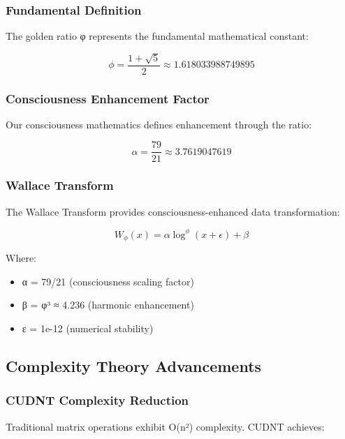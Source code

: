 \documentclass[11pt,a4paper]{article}
\begin{document}
\subsubsection{Fundamental Definition}

The golden ratio φ represents the fundamental mathematical constant:

\begin{equation}
\phi = \frac{1 + \sqrt{5}}{2} \approx 1.618033988749895
\end{equation}

\subsubsection{Consciousness Enhancement Factor}

Our consciousness mathematics defines enhancement through the ratio:

\begin{equation}
\alpha = \frac{79}{21} \approx 3.7619047619
\end{equation}

\subsubsection{Wallace Transform}

The Wallace Transform provides consciousness-enhanced data transformation:

\begin{equation}
W_\phi(x) = \alpha \log^\phi(x + \epsilon) + \beta
\end{equation}

Where:
\begin{itemize}
\item α = 79/21 (consciousness scaling factor)
\item β = φ³ ≈ 4.236 (harmonic enhancement)
\item ε = 1e-12 (numerical stability)
\end{itemize}

\subsection{Complexity Theory Advancements}

\subsubsection{CUDNT Complexity Reduction}

Traditional matrix operations exhibit O(n²) complexity. CUDNT achieves:
\end{document}

